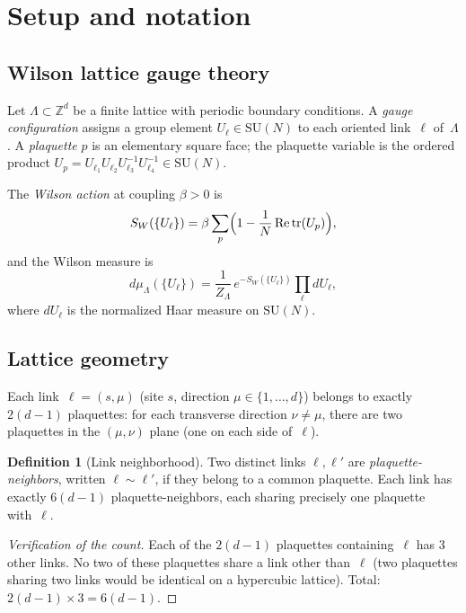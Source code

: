 \documentclass[11pt]{article}
\theoremstyle{definition}
\newtheorem{definition}[theorem]{Definition}
\theoremstyle{remark}
\newcommand{\Z}{\mathbb{Z}}
\newcommand{\SU}{\mathrm{SU}}
\newcommand{\tr}{\mathrm{tr}}
\begin{document}
\section{Setup and notation}\label{sec:setup}

\subsection{Wilson lattice gauge theory}

Let $\Lambda \subset \Z^d$ be a finite lattice with periodic boundary 
conditions.  A \emph{gauge configuration} assigns a group element 
$U_\ell \in \SU(N)$ to each oriented link~$\ell$ of~$\Lambda$.  
A \emph{plaquette} $p$ is an elementary square face; the plaquette 
variable is the ordered product 
$U_p = U_{\ell_1} U_{\ell_2} U_{\ell_3}^{-1} U_{\ell_4}^{-1} \in \SU(N)$.

The \emph{Wilson action} at coupling $\beta > 0$ is
\begin{equation}\label{eq:wilson}
  S_W(\{U_\ell\}) = \beta \sum_p 
  \Bigl(1 - \frac{1}{N}\,\mathrm{Re}\,\tr(U_p)\Bigr),
\end{equation}
and the Wilson measure is
\[
  d\mu_\Lambda(\{U_\ell\}) = \frac{1}{Z_\Lambda}\,
  e^{-S_W(\{U_\ell\})} \prod_\ell dU_\ell,
\]
where $dU_\ell$ is the normalized Haar measure on $\SU(N)$.

\subsection{Lattice geometry}

Each link~$\ell = (s,\mu)$ (site $s$, direction $\mu \in \{1,\ldots,d\}$) 
belongs to exactly $2(d-1)$ plaquettes: for each transverse direction 
$\nu \neq \mu$, there are two plaquettes in the $(\mu,\nu)$ plane 
(one on each side of~$\ell$).

\begin{definition}[Link neighborhood]
Two distinct links $\ell, \ell'$ are \emph{plaquette-neighbors}, 
written $\ell \sim \ell'$, if they belong to a common plaquette.  
Each link has exactly $6(d-1)$ plaquette-neighbors, each sharing 
precisely one plaquette with~$\ell$.
\end{definition}

\begin{proof}[Verification of the count]
Each of the $2(d-1)$ plaquettes containing~$\ell$ has 3 other 
links.  No two of these plaquettes share a link other than~$\ell$ 
(two plaquettes sharing two links would be identical on a 
hypercubic lattice).  Total: $2(d-1) \times 3 = 6(d-1)$.
\end{proof}
\end{document}
